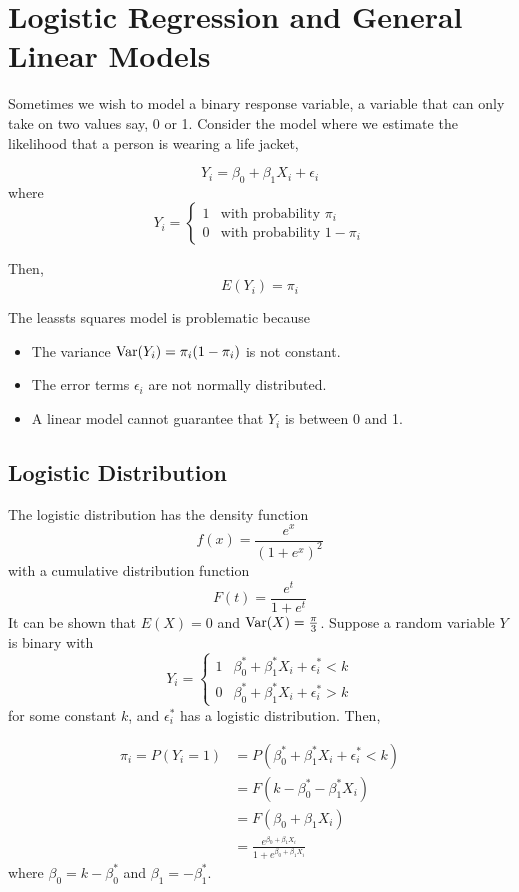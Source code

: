 \chapter{Logistic Regression and General Linear Models}

Sometimes we wish to model a binary response variable, a variable that can only take on two values say, 0 or 1. Consider the model where we estimate the likelihood that a person is wearing a life jacket, 

\[Y_i = \beta_0 + \beta_1X_i + \epsilon_i\]
where
\[Y_i = \begin{cases}
    1 & \text{with probability } \pi_i \\
    0 & \text{with probability } 1 - \pi_i
\end{cases}\]

Then, 
\[E(Y_i) = \pi_i\]

The leassts squares model is problematic because 
\begin{itemize}
    \item The variance $\operatorname{Var}(Y_i) = \pi_i(1 - \pi_i)$ is not constant. 
    \item The error terms $\epsilon_i$ are not normally distributed.
    \item A linear model cannot guarantee that $\hat{Y}_i$ is between 0 and 1.
\end{itemize}

\section{Logistic Distribution}

The logistic distribution has the density function 
\[f(x) = \frac{e^x}{(1+e^x)^2}\]
with a cumulative distribution function
\[F(t) = \frac{e^t}{1+e^t}\]
It can be shown that $E(X) = 0$ and $\operatorname{Var}(X) = \frac{\pi}{3}$. Suppose a random variable $Y$ is binary with 
\[Y_i = \begin{cases}
    1 & \beta^*_0 + \beta^*_1X_i + \epsilon^*_i < k\\
    0 & \beta^*_0 + \beta^*_1X_i + \epsilon^*_i > k
\end{cases}\]
for some constant $k$, and $\epsilon_i^*$ has a logistic distribution. Then, 

\begin{align*}
    \pi_i = P(Y_i = 1) &= P(\beta^*_0 + \beta^*_1X_i + \epsilon^*_i < k)\\
    &= F(k-\beta^*_0 - \beta^*_1X_i)\\
    &= F(\beta_0 + \beta_1X_i)\\
    &= \frac{e^{\beta_0 + \beta_1X_i}}{1+e^{\beta_0 + \beta_1X_i}}
\end{align*}
where $\beta_0 = k - \beta_0^*$ and $\beta_1 = -\beta_1^*$. 

